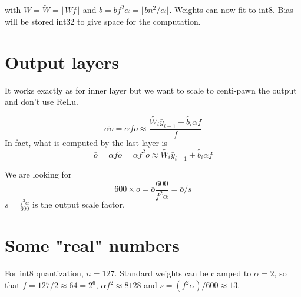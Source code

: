 \documentclass{article}
\begin{document}
with $\bar{W} = \tilde{W} = \lfloor Wf \rfloor$ and $\bar{b} = bf^2\alpha = \lfloor b n^2/\alpha \rfloor$.  Weights can now fit to int8. Bias will be stored int32 to give space for the computation.

\section{Output layers}

It works exactly as for inner layer but we want to scale to centi-pawn the output and don't use ReLu.

$$\alpha \tilde{o} = \alpha f o \approx \frac{\tilde{W_i} \bar{y}_{i-1} + \tilde{b_i}\alpha f}{f}$$
In fact, what is computed by the last layer is
$$\bar{o} = \alpha f \tilde{o} = \alpha f^2 o \approx\tilde{W_i} \bar{y}_{i-1} + \tilde{b_i}\alpha f$$

We are looking for 
$$600\times o = \bar{o} \frac{600}{f^2\alpha} = \bar{o}/s$$
$s = \frac{f^2\alpha}{600}$ is the output scale factor.

\section{Some "real" numbers}

For int8 quantization, $n=127$. Standard weights can be clamped to $\alpha = 2$, so that $f = 127/2 \approx 64 = 2^6$, $\alpha f^2 \approx 8128$ and $s = (f^2\alpha)/600 \approx 13$.
\end{document}
